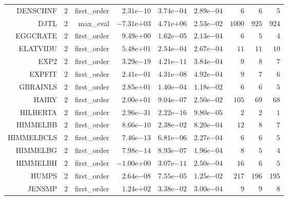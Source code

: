 \begin{longtable}{rrrrrrrrr}
DENSCHNF & \(     2\) & first\_order & \( 2.31\)e\(-10\) & \( 3.74\)e\(-04\) & \( 2.89\)e\(-04\) & \(     6\) & \(     6\) & \(     5\) \\
DJTL & \(     2\) & max\_eval & \(-7.31\)e\(+03\) & \( 4.71\)e\(+06\) & \( 2.53\)e\(-02\) & \(  1000\) & \(   925\) & \(   924\) \\
EGGCRATE & \(     2\) & first\_order & \( 9.49\)e\(+00\) & \( 1.62\)e\(-05\) & \( 2.13\)e\(-04\) & \(     6\) & \(     5\) & \(     4\) \\
ELATVIDU & \(     2\) & first\_order & \( 5.48\)e\(+01\) & \( 2.54\)e\(-04\) & \( 2.67\)e\(-04\) & \(    11\) & \(    11\) & \(    10\) \\
EXP2 & \(     2\) & first\_order & \( 3.29\)e\(-19\) & \( 4.21\)e\(-11\) & \( 3.84\)e\(-04\) & \(     9\) & \(     8\) & \(     7\) \\
EXPFIT & \(     2\) & first\_order & \( 2.41\)e\(-01\) & \( 4.31\)e\(-08\) & \( 4.92\)e\(-04\) & \(     9\) & \(     7\) & \(     6\) \\
GBRAINLS & \(     2\) & first\_order & \( 2.85\)e\(+01\) & \( 1.40\)e\(-04\) & \( 1.18\)e\(-02\) & \(     6\) & \(     6\) & \(     5\) \\
HAIRY & \(     2\) & first\_order & \( 2.00\)e\(+01\) & \( 9.04\)e\(-07\) & \( 2.50\)e\(-02\) & \(   105\) & \(    69\) & \(    68\) \\
HILBERTA & \(     2\) & first\_order & \( 2.96\)e\(-31\) & \( 2.22\)e\(-16\) & \( 9.80\)e\(-05\) & \(     2\) & \(     2\) & \(     1\) \\
HIMMELBB & \(     2\) & first\_order & \( 8.66\)e\(-10\) & \( 2.38\)e\(-02\) & \( 8.20\)e\(-04\) & \(    12\) & \(     8\) & \(     7\) \\
HIMMELBCLS & \(     2\) & first\_order & \( 7.46\)e\(-13\) & \( 6.81\)e\(-06\) & \( 2.27\)e\(-04\) & \(     6\) & \(     6\) & \(     5\) \\
HIMMELBG & \(     2\) & first\_order & \( 7.98\)e\(-14\) & \( 8.93\)e\(-07\) & \( 1.96\)e\(-04\) & \(     8\) & \(     5\) & \(     4\) \\
HIMMELBH & \(     2\) & first\_order & \(-1.00\)e\(+00\) & \( 3.07\)e\(-11\) & \( 2.50\)e\(-04\) & \(    16\) & \(     6\) & \(     5\) \\
HUMPS & \(     2\) & first\_order & \( 2.64\)e\(-08\) & \( 7.55\)e\(-05\) & \( 1.25\)e\(-02\) & \(   217\) & \(   196\) & \(   195\) \\
JENSMP & \(     2\) & first\_order & \( 1.24\)e\(+02\) & \( 3.38\)e\(-02\) & \( 3.00\)e\(-04\) & \(     9\) & \(     9\) & \(     8\) \\

\end{longtable}
